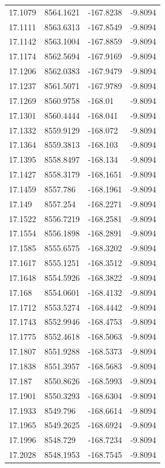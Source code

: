 \begin{table}[H]
\begin{tabular}{llll}
17.1079 & 8564.1621 & -167.8238 & -9.8094 \\
17.1111 & 8563.6313 & -167.8549 & -9.8094 \\
17.1142 & 8563.1004 & -167.8859 & -9.8094 \\
17.1174 & 8562.5694 & -167.9169 & -9.8094 \\
17.1206 & 8562.0383 & -167.9479 & -9.8094 \\
17.1237 & 8561.5071 & -167.9789 & -9.8094 \\
17.1269 & 8560.9758 & -168.01 & -9.8094 \\
17.1301 & 8560.4444 & -168.041 & -9.8094 \\
17.1332 & 8559.9129 & -168.072 & -9.8094 \\
17.1364 & 8559.3813 & -168.103 & -9.8094 \\
17.1395 & 8558.8497 & -168.134 & -9.8094 \\
17.1427 & 8558.3179 & -168.1651 & -9.8094 \\
17.1459 & 8557.786 & -168.1961 & -9.8094 \\
17.149 & 8557.254 & -168.2271 & -9.8094 \\
17.1522 & 8556.7219 & -168.2581 & -9.8094 \\
17.1554 & 8556.1898 & -168.2891 & -9.8094 \\
17.1585 & 8555.6575 & -168.3202 & -9.8094 \\
17.1617 & 8555.1251 & -168.3512 & -9.8094 \\
17.1648 & 8554.5926 & -168.3822 & -9.8094 \\
17.168 & 8554.0601 & -168.4132 & -9.8094 \\
17.1712 & 8553.5274 & -168.4442 & -9.8094 \\
17.1743 & 8552.9946 & -168.4753 & -9.8094 \\
17.1775 & 8552.4618 & -168.5063 & -9.8094 \\
17.1807 & 8551.9288 & -168.5373 & -9.8094 \\
17.1838 & 8551.3957 & -168.5683 & -9.8094 \\
17.187 & 8550.8626 & -168.5993 & -9.8094 \\
17.1901 & 8550.3293 & -168.6304 & -9.8094 \\
17.1933 & 8549.796 & -168.6614 & -9.8094 \\
17.1965 & 8549.2625 & -168.6924 & -9.8094 \\
17.1996 & 8548.729 & -168.7234 & -9.8094 \\
17.2028 & 8548.1953 & -168.7545 & -9.8094 \\

\end{tabular}
\end{table}
